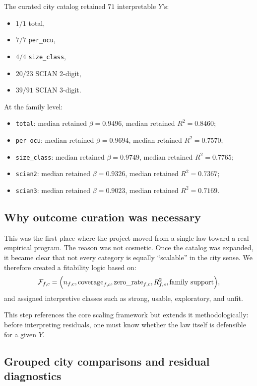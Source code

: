 \documentclass[11pt]{article}
\begin{document}
The curated city catalog retained \(71\) interpretable \(Y\)'s:
\begin{itemize}
\item \(1/1\) total,
\item \(7/7\) \texttt{per\_ocu},
\item \(4/4\) \texttt{size\_class},
\item \(20/23\) SCIAN 2-digit,
\item \(39/91\) SCIAN 3-digit.
\end{itemize}

At the family level:
\begin{itemize}
\item \texttt{total}: median retained \(\beta = 0.9496\), median retained \(R^2 = 0.8460\);
\item \texttt{per\_ocu}: median retained \(\beta = 0.9694\), median retained \(R^2 = 0.7570\);
\item \texttt{size\_class}: median retained \(\beta = 0.9749\), median retained \(R^2 = 0.7765\);
\item \texttt{scian2}: median retained \(\beta = 0.9326\), median retained \(R^2 = 0.7367\);
\item \texttt{scian3}: median retained \(\beta = 0.9023\), median retained \(R^2 = 0.7169\).
\end{itemize}

\subsection{Why outcome curation was necessary}

This was the first place where the project moved from a single law toward a real empirical program. The reason was not cosmetic. Once the catalog was expanded, it became clear that not every category is equally ``scalable'' in the city sense. We therefore created a fitability logic based on:
\begin{equation}
\mathcal{F}_{f,c}
=
\Bigl(
n_{f,c},
\mathrm{coverage}_{f,c},
\mathrm{zero\_rate}_{f,c},
R^2_{f,c},
\mathrm{family\ support}
\Bigr),
\end{equation}
and assigned interpretive classes such as strong, usable, exploratory, and unfit.

This step references the core scaling framework \citep{bettencourt2010urban} but extends it methodologically: before interpreting residuals, one must know whether the law itself is defensible for a given \(Y\).

\subsection{Grouped city comparisons and residual diagnostics}
\end{document}
